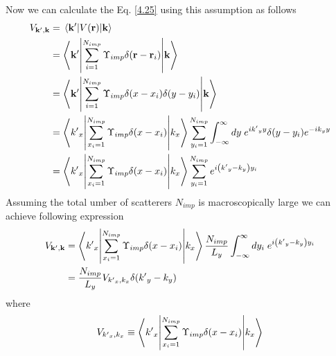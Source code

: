 \noindent
Now we can calculate the Eq. \eqref{4.25} using this assumption as follows
\begin{equation} \label{4.31}
  \begin{aligned}
    V_{\mathbf{k'},\mathbf{k}}
    & = \mel{\mathbf{k'}}{V(\mathbf{r})}{\mathbf{k}} \\
    & = \mel**{\mathbf{k'}}{\sum_{i=1}^{N_{imp}}
    \Upsilon_{imp} \delta(\mathbf{r}-\mathbf{r}_i)}{\mathbf{k}} \\
    & = \mel**{\mathbf{k'}}{\sum_{i=1}^{N_{imp}}
    \Upsilon_{imp} \delta(x-x_i)\delta(y-y_i)}{\mathbf{k}} \\
    & = \mel**{{k'}_x}{\sum_{x_i=1}^{N_{imp}}
    \Upsilon_{imp} \delta(x-x_i)}{k_x}
    \sum_{y_i=1}^{N_{imp}}
    \int_{-\infty}^{\infty} dy\; e^{i{k'}_y y} \delta(y-y_i) e^{-i{k}_y y} \\
    &=
    \mel**{{k'}_x}{\sum_{x_i=1}^{N_{imp}}
    \Upsilon_{imp} \delta(x-x_i)}{k_x}
    \sum_{y_i=1}^{N_{imp}}
    e^{i\qty({k'}_y - k_y)y_i}
  \end{aligned}
\end{equation}
Assuming the total  umber of scatterers $N_{imp}$ is macroscopically large we can achieve following expression
\begin{equation} \label{4.32}
  \begin{aligned}
    V_{\mathbf{k'},\mathbf{k}}
    & =
    \mel**{{k'}_x}{\sum_{x_i=1}^{N_{imp}}
    \Upsilon_{imp} \delta(x-x_i)}{k_x}
    \frac{N_{imp}}{L_y} \int_{-\infty}^{\infty} dy_i\;
    e^{i\qty({k'}_y - k_y)y_i} \\
    & =
    \frac{N_{imp}}{L_y} V_{{k'}_x,k_x} \delta({k'}_y - k_y)
  \end{aligned}
\end{equation}
where
\begin{equation} \label{4.33}
  V_{{k'}_x,k_x} \equiv
  \mel**{{k'}_x}{\sum_{x_i=1}^{N_{imp}}
  \Upsilon_{imp} \delta(x-x_i)}{k_x}
\end{equation}

